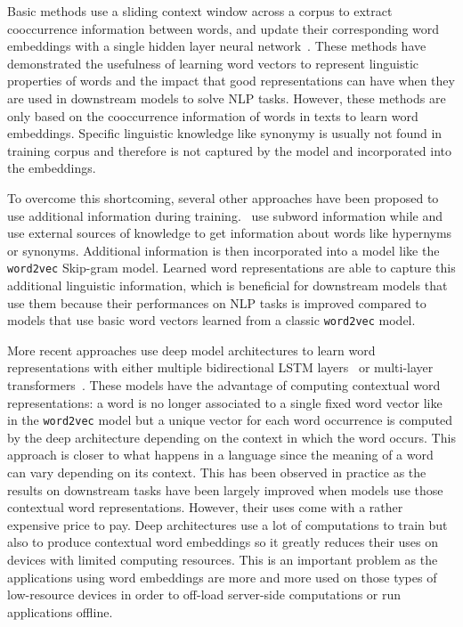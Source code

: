   Basic methods use a sliding context window across a corpus to extract
  cooccurrence information between words, and update their corresponding word
  embeddings with a single hidden layer neural
  network~\citep{collobert2008unified, collobert2011natural,
  mikolov2013efficient, mikolov2013distributed}. These methods have demonstrated
  the usefulness of learning word vectors to represent linguistic properties of
  words and the impact that good representations can have when they are used in
  downstream models to solve NLP tasks. However, these methods are only based on
  the cooccurrence information of words in texts to learn word embeddings.
  Specific linguistic knowledge like synonymy is usually not found in training
  corpus and therefore is not captured by the model and incorporated into the
  embeddings.\medskip

  To overcome this shortcoming, several other approaches have been proposed to
  use additional information during training.~\citet{bojanowski2016enriching}
  use subword information while \citet{yudredze2014improving}
  and~\citet{kiela2015specializing} use external sources of knowledge to get
  information about words like hypernyms or synonyms. Additional information is
  then incorporated into a model like the \texttt{word2vec} Skip-gram model.
  Learned word representations are able to capture this additional linguistic
  information, which is beneficial for downstream models that use them because
  their performances on NLP tasks is improved compared to models that use basic
  word vectors learned from a classic \texttt{word2vec} model.\medskip

  More recent approaches use deep model architectures to learn word
  representations with either multiple bidirectional LSTM
  layers~\citep{peters2018elmo} or multi-layer
  transformers~\citep{devlin2019bert}. These models have the advantage of
  computing contextual word representations: a word is no longer associated to a
  single fixed word vector like in the \texttt{word2vec} model but a unique
  vector for each word occurrence is computed by the deep architecture depending
  on the context in which the word occurs. This approach is closer to what
  happens in a language since the meaning of a word can vary depending on its
  context. This has been observed in practice as the results on downstream tasks
  have been largely improved when models use those contextual word
  representations. However, their uses come with a rather expensive price to
  pay. Deep architectures use a lot of computations to train but also to produce
  contextual word embeddings so it greatly reduces their uses on devices with
  limited computing resources. This is an important problem as the applications
  using word embeddings are more and more used on those types of low-resource
  devices in order to off-load server-side computations or run applications
  offline.\medskip

